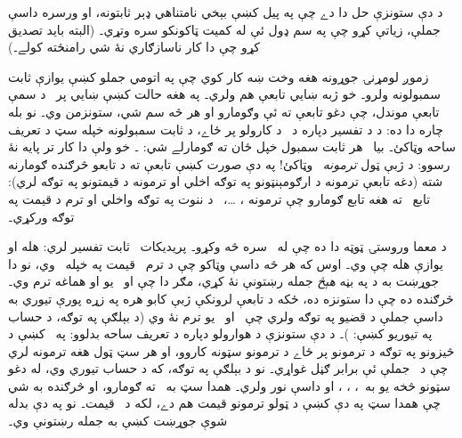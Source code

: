 \documentclass[12pt,a4paper,oneside]{report}
\theoremstyle{definition}
\begin{document}
\label{olpseg:OLP-0128-B012:start}
د دې ستونزې حل دا دے چې په پيل کښې بېخي نامتناهي ډېر ثابتونه، او
ورسره داسې جملې، زياتې کړو چې په سم ډول ئې له کميت ټاکونکو سره
وتړي۔ (البته بايد تصديق کړو چې دا کار ناسازګاري نۀ شي رامنځته
کولے۔)
\label{olpseg:OLP-0128-B012:end}

\label{olpseg:OLP-0128-B013:start}
زموږ لومړنۍ جوړونه هغه وخت ښه کار کوي چې په اتومي جملو کښې يوازې
ثابت سمبولونه ولرو۔ خو ژبه ښايي تابعې هم ولري۔ په هغه
حالت کښې ښايي پر~\LR{$\Nat$} د سمې تابعې موندل، چې دغو تابعې
ته ئې وګومارو او هر څه سم شي، ستونزمن وي۔ نو بله چاره دا ده: د
 د تفسير دپاره د~ د کارولو پر ځاے، د ثابت سمبولونه
خپله سټ د تعريف ساحه وټاکئ۔ بيا~ هر ثابت سمبول خپل
ځان ته ګومارلے شي: ۔ خو ولې دا
کار تر پايه نۀ رسوو: د ژبې ټول \emph{ترمونه}~ وټاکئ!{}
په دې صورت کښې تابعې ته د تابعو څرګنده ګومارنه شته (دغه
تابعې ترمونه د ارګومېنټونو په توګه اخلي او ترمونه د قيمتونو په توګه
لري): تابع~ ته هغه تابع ګومارو چې  ترمونه
، \dots،~ د ننوت په توګه واخلي او ترم
 د قيمت په توګه ورکړي۔
\label{olpseg:OLP-0128-B013:end}

\label{olpseg:OLP-0128-B014:start}
د معما وروستۍ ټوټه دا ده چې له~\LR{$\eq$} سره څه وکړو۔
پريديکات~\LR{$\eq$} ثابت تفسير لري:
 هله او يوازې هله چې
 وي۔ اوس که هر څه داسې وټاکو چې د
ترم~ قيمت په خپله~ وي، نو دا جوړښت به د
\LR{$\eq[t][t']$} په بڼه \emph{هېڅ} جمله رښتونې نۀ کړي، مګر دا چې
 او~ يو او هماغه ترم وي۔ څرګنده ده چې دا ستونزه ده، ځکه د
تابعې لرونکې ژبې کابو هره په زړه پورې تيوري به داسې جملې
\LR{$\eq[t][t']$} د قضيو په توګه ولري چې~ او~ يو ترم نۀ وي (د
بېلګې په توګه، د حساب په تيوريو کښې:
)۔ د دې ستونزې د هوارولو دپاره د
 تعريف ساحه بدلوو: په~ کښې د څيزونو په
توګه د ترمونو پر ځاے د ترمونو سټونه کاروو، او هر سټ ټول هغه ترمونه
لري چې د~\LR{$\Gamma$} جملې ئې برابر ګڼل غواړي۔ نو د بېلګې په توګه، که
\LR{$\Gamma$} د حساب تيوري وي، له دغو سټونو څخه يو به~،
، ، او داسې نور ولري۔
همدا سټ به~ ته ګومارو، او څرګنده به شي چې همدا سټ په دې
کښې د ټولو ترمونو قيمت هم دے، لکه د~ قيمت۔
نو په دې بدله شوې جوړښت کښې به جمله
 رښتونې وي۔
\label{olpseg:OLP-0128-B014:end}
\end{document}
